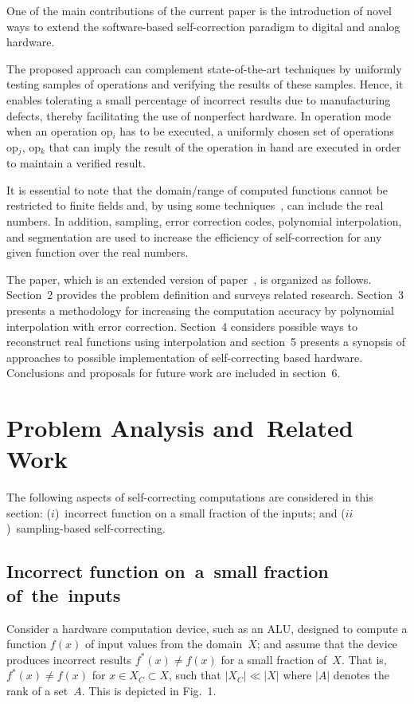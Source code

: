 \begin{multicols}{2}
   One of the main contributions of the current paper is the introduction of novel ways 
   to extend the software-based self-correction 
paradigm to digital and analog hardware. 
   
The proposed approach can complement state-of-the-art techniques 
by uniformly testing samples of operations and verifying 
the results of these samples. Hence, it enables tolerating a small percentage of incorrect results due to manufacturing defects,
thereby facilitating the use of nonperfect hardware. In 
operation mode when an operation op$_i$ has to be executed, a uniformly chosen set of operations op$_j$, op$_k$  that 
can imply the result of the operation in hand are executed in order to maintain a verified result.

It is essential to note that the domain/range of computed functions cannot be restricted to 
finite fields and, by using some 
techniques~\cite{4-dol, 12-dol}, can include the real numbers. In addition,  sampling, error correction codes, 
polynomial interpolation, and segmentation are used
to increase the efficiency of self-correction for any given function over 
the real numbers. 

   The paper, which is an extended version of paper~\cite{14-dol}, is organized as follows. Section~2 provides the 
problem definition and surveys related research. Section~3 presents a methodology for increasing the computation 
accuracy by polynomial interpolation with error correction. Section~4 considers possible ways to reconstruct real 
functions using interpolation and section~5 presents a synopsis of approaches to possible implementation of 
self-correcting based hardware. Conclusions and proposals for future work 
are included in section~6.

\section{Problem Analysis and~Related Work}
   
   \noindent
   The following aspects of self-correcting computations
   are considered in this section:  ($i$)~incorrect function on a small 
fraction of the inputs; and ($ii$)~sampling-based self-correcting. 

\subsection{Incorrect function on~a~small fraction of~the~inputs}
    
\noindent
    Consider a hardware computation device, such as an ALU, designed to compute a function 
$f(x)$ of input values from the domain~$X$; and assume that the device produces incorrect results $f^*(x)\not= f(x)$ 
for a small fraction of~$X$. That is, $f^*(x)\not= f(x)$ for $x\in X_C\subset X$, such that $\vert X_C\vert \ll \vert 
X\vert$ where $\vert A\vert$ denotes the rank of a set~$A$. This is depicted in Fig.~1.


\end{multicols}
